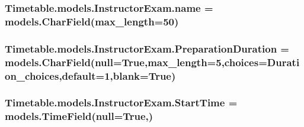 \subsubsection[{\texorpdfstring{name}{name}}]{\setlength{\rightskip}{0pt plus 5cm}Timetable.\+models.\+Instructor\+Exam.\+name = models.\+Char\+Field(max\+\_\+length=50)\hspace{0.3cm}{\ttfamily [static]}}\hypertarget{classTimetable_1_1models_1_1InstructorExam_a48cd7517f1628975472ef83904920218}{}\label{classTimetable_1_1models_1_1InstructorExam_a48cd7517f1628975472ef83904920218}
\subsubsection[{\texorpdfstring{Preparation\+Duration}{PreparationDuration}}]{\setlength{\rightskip}{0pt plus 5cm}Timetable.\+models.\+Instructor\+Exam.\+Preparation\+Duration = models.\+Char\+Field(null=True,max\+\_\+length=5,choices={\bf Duration\+\_\+choices},default=\textquotesingle{}1\textquotesingle{},blank=True)\hspace{0.3cm}{\ttfamily [static]}}\hypertarget{classTimetable_1_1models_1_1InstructorExam_aa762dcd26595ad1bf6cc7e361b6940d0}{}\label{classTimetable_1_1models_1_1InstructorExam_aa762dcd26595ad1bf6cc7e361b6940d0}
\subsubsection[{\texorpdfstring{Start\+Time}{StartTime}}]{\setlength{\rightskip}{0pt plus 5cm}Timetable.\+models.\+Instructor\+Exam.\+Start\+Time = models.\+Time\+Field(null=True,)\hspace{0.3cm}{\ttfamily [static]}}\hypertarget{classTimetable_1_1models_1_1InstructorExam_a06e43e83ab42cca5a7ae69a2d76e1a48}{}\label{classTimetable_1_1models_1_1InstructorExam_a06e43e83ab42cca5a7ae69a2d76e1a48}
